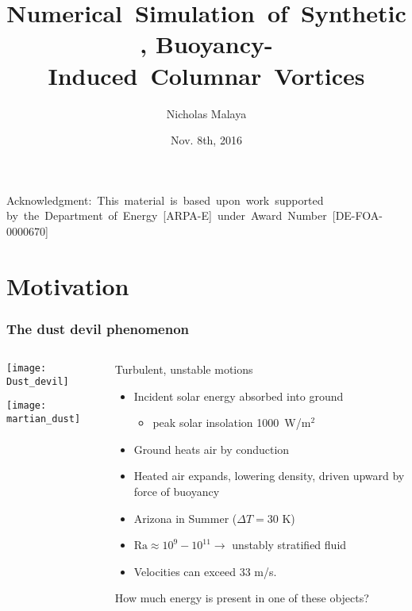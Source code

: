 \documentclass[mathserif]{beamer}
\date{Nov. 8th, 2016}
\author[Nicholas Malaya]{Nicholas Malaya}
\institute{Department of Mechanical Engineering \\ The University of
Texas at Austin}
\title[Dissertation Defense]{%
    \mbox{Numerical Simulation of Synthetic,}
    \mbox{Buoyancy-Induced Columnar Vortices}
}
\newcommand{\rarrow}{\rightarrow}
\begin{document}

\begin{frame}
%
\titlepage{}


\mbox{{\scriptsize Acknowledgment: This material is based upon work
 supported}}
\mbox{{\scriptsize by the Department of Energy [ARPA-E] under Award
 Number [DE-FOA-0000670]}} 
%
\end{frame}


 \section{Motivation}

\begin{frame}
  \frametitle{The dust devil phenomenon}
  \begin{columns}[]
    \begin{column}{0.45\linewidth}
      \begin{center}
        \texttt{[image: Dust\_devil]}
      \end{center}
      \begin{center}
        \texttt{[image: martian\_dust]}
      \end{center}
    \end{column}
    \begin{column}{0.55\linewidth}

      \begin{block}{Turbulent, unstable motions}
        \begin{itemize}
	 \item Incident solar energy absorbed into ground
	       \begin{itemize}
		\item peak solar insolation 1000~W/$\text{m}^2$ 
	       \end{itemize}
	 \item Ground heats air by conduction
	 \item Heated air expands, lowering density, 
	       driven upward by force of buoyancy
	 \item Arizona in Summer ($\Delta T= 30$ K) 
	 \item $\text{Ra} \approx 10^9 - 10^{11} \rarrow$ 
	       unstably stratified fluid
	 \item Velocities can exceed 33 m/s.
        \end{itemize}
      \end{block}
      How much energy is present in one of these objects? 
      \end{column}
    \end{columns}
  \end{frame}
\end{document}
